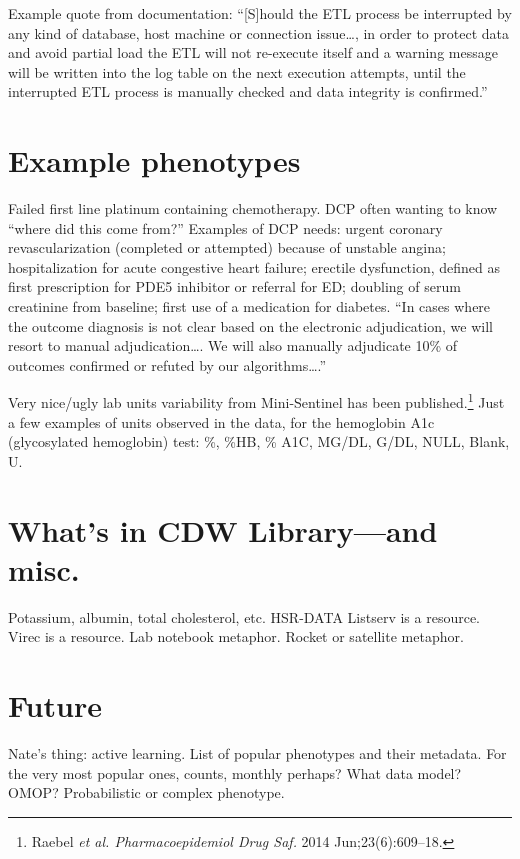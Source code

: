 \documentclass{tufte-handout}
\begin{document}
Example quote from documentation: ``[S]hould the ETL process be
interrupted by any kind of database, host machine or connection
issue\ldots{}, in order to protect data and avoid partial load the ETL
will not re-execute itself and a warning message will be written into
the log table on the next execution attempts, until the interrupted
ETL process is manually checked and data integrity is confirmed.''


\section{Example phenotypes}

Failed first line platinum containing chemotherapy. DCP often wanting
to know ``where did this come from?'' Examples of DCP needs: urgent
coronary revascularization (completed or attempted) because of
unstable angina; hospitalization for acute congestive heart failure;
erectile dysfunction, defined as first prescription for PDE5 inhibitor
or referral for ED; doubling of serum creatinine from baseline; first
use of a medication for diabetes. ``In cases where the outcome
diagnosis is not clear based on the electronic adjudication, we will
resort to manual adjudication\ldots{}. We will also manually adjudicate
10\% of outcomes confirmed or refuted by our algorithms\ldots{}.''

Very nice/ugly lab units variability from Mini-Sentinel has been
published.\footnote{Raebel \emph{et al. Pharmacoepidemiol Drug Saf.}
  2014 Jun;23(6):609--18.} Just a few examples of units observed in
the data, for the hemoglobin A1c (glycosylated hemoglobin) test: \%,
\%HB, \% A1C, MG/DL, G/DL, NULL, Blank, U.

\section{What's in CDW Library---and misc.}

Potassium, albumin, total cholesterol, etc. HSR-DATA Listserv is a
resource. Virec is a resource. Lab notebook metaphor. Rocket or
satellite metaphor.

\section{Future}

Nate's thing: active learning. List of popular phenotypes and their
metadata. For the very most popular ones, counts, monthly perhaps?
What data model? OMOP? Probabilistic or complex phenotype.
\end{document}
